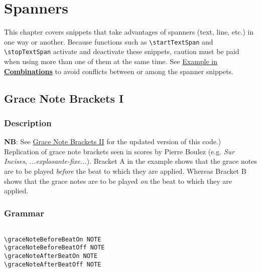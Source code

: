 
\chapter {Spanners}

This chapter covers snippets that take advantages of spanners (text, line, etc.) in one way or another. Because functions such as \verb|\startTextSpan| and \verb|\stopTextSpan| activate and deactivate these snippets, caution must be paid when using more than one of them at the same time. See \hyperref[sec:comb_spanners]{Example in \textbf{Combinations}} to avoid conflicts between or among the spanner snippets.

\section {Grace Note Brackets I}
\hfill
{}
\hfill

\subsection{Description}
\textbf{NB}: See \hyperref[sec:gracenote2]{Grace Note Brackets II} for the updated version of this code.)
Replication of grace note brackets seen in scores by Pierre Boulez (e.g. \textit{Sur Incises}\autocite{RN1738}, \textit{...explosante-fixe...}\autocite{RN1737}). Bracket A in the example shows that the grace notes are to be played \textit{before} the beat to which they are applied. Whereas Bracket B shows that the grace notes are to be played \textit{on} the beat to which they are applied.

\subsection{Grammar}
\begin{verbatim}

\graceNoteBeforeBeatOn NOTE
\graceNoteBeforeBeatOff NOTE
\graceNoteAfterBeatOn NOTE
\graceNoteAfterBeatOff NOTE

\end{verbatim}

